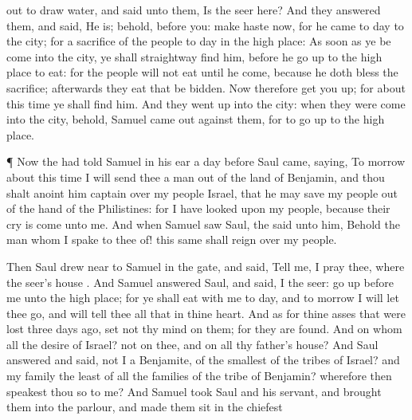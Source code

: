 {out to
draw
water, and
said unto them,
Is the
seer here?
And they
answered them, and
said, He
is; behold,
{}
before you: make
haste now, for he
came to
day to the
city; for
{} a
sacrifice of the
people to
day in the high
place:
As soon as ye be
come into the
city, ye shall
straightway
find him, before he go
up to the high
place to
eat: for the
people will not
eat until he
come, because he doth
bless the
sacrifice;
{}
afterwards they
eat that be
bidden. Now therefore get you
up; for about this
time ye shall
find him.
And they went
up
into the
city:
{} when they were
come into the
city, behold,
Samuel came
out
against them, for to go
up to the high
place.
\par }{\PP {}¶ Now the
{} had
told
Samuel in his
ear
a
day
before
Saul
came,
saying,
To
morrow about this
time I will
send thee a
man out of the
land of
Benjamin, and thou shalt
anoint him
{}
captain over my
people
Israel, that he may
save my
people out of the
hand of the
Philistines: for I have
looked upon my
people, because their
cry is
come unto me.
And when
Samuel
saw
Saul, the
{}
said unto him, Behold the
man whom I
spake to thee of! this same shall
reign over my
people.
\par }{\PP {}Then
Saul drew
near to
Samuel
in the
gate, and
said,
Tell me, I pray thee,
where the
seer’s
house
{}.
And
Samuel
answered
Saul, and
said, I
{} the
seer: go
up
before me unto the high
place; for ye shall
eat with me to
day, and to
morrow I will let thee
go, and will
tell thee all that
{} in thine
heart.
And as for thine
asses that were
lost
three
days
ago,
set not thy
mind on them; for they are
found. And on whom
{} all the
desire of
Israel?
{} not on thee, and on all thy
father’s
house?
And
Saul
answered and
said,
{} not I a
Benjamite, of the
smallest of the
tribes of
Israel? and my
family the
least of all the
families of the
tribe of
Benjamin? wherefore then
speakest thou
so to me?
And
Samuel
took
Saul and his
servant, and
brought them into the
parlour, and made them
sit in the
chiefest
}
